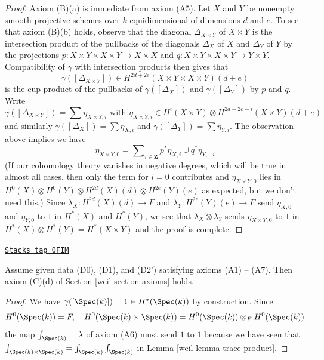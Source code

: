\begin{proof}
Axiom (B)(a) is immediate from axiom (A5).
Let $X$ and $Y$ be nonempty smooth projective schemes over $k$
equidimensional of dimensions $d$ and $e$. To see that axiom (B)(b)
holds, observe that the diagonal $\Delta_{X \times Y}$ of $X \times Y$
is the intersection product of the pullbacks of the diagonals
$\Delta_X$ of $X$ and $\Delta_Y$ of $Y$ by the projections
$p : X \times Y \times X \times Y \to X \times X$ and
$q : X \times Y \times X \times Y \to Y \times Y$.
Compatibility of $\gamma$ with intersection products then gives
that
$$
\gamma([\Delta_{X \times Y}]) \in
H^{2d + 2e}(X \times Y \times X \times Y)(d + e)
$$
is the cup product of the pullbacks of $\gamma([\Delta_X])$
and $\gamma([\Delta_Y])$ by $p$ and $q$. Write
$$
\gamma([\Delta_{X \times Y}]) = \sum \eta_{X \times Y, i}
\text{ with }
\eta_{X \times Y, i} \in
H^i(X \times Y) \otimes H^{2d + 2e - i}(X \times Y)(d + e)
$$
and similarly $\gamma([\Delta_X]) = \sum \eta_{X, i}$ and
$\gamma([\Delta_Y]) = \sum \eta_{Y, i}$. The observation above
implies we have
$$
\eta_{X \times Y, 0} =
\sum\nolimits_{i \in \mathbf{Z}} p^*\eta_{X, i} \cup q^*\eta_{Y, -i}
$$
(If our cohomology theory vanishes in negative degrees, which will
be true in almost all cases, then only the term for $i = 0$ contributes
and $\eta_{X \times Y, 0}$ lies in
$H^0(X) \otimes H^0(Y) \otimes H^{2d}(X)(d) \otimes H^{2e}(Y)(e)$ as expected,
but we don't need this.) Since $\lambda_X : H^{2d}(X)(d) \to F$ and
$\lambda_Y : H^{2e}(Y)(e) \to F$ send $\eta_{X, 0}$ and $\eta_{Y, 0}$
to $1$ in $H^*(X)$ and $H^*(Y)$, we see that $\lambda_X \otimes \lambda_Y$
sends $\eta_{X \times Y, 0}$ to $1$ in
$H^*(X) \otimes H^*(Y) = H^*(X \times Y)$ and the proof is complete.
\end{proof}

\begin{lemma}
\label{weil-lemma-trace-base}
\href{https://stacks.math.columbia.edu/tag/0FIM}{\texttt{Stacks tag 0FIM}}

Assume given data (D0), (D1), and (D2') satisfying axioms (A1) -- (A7).
Then axiom (C)(d) of Section \ref{weil-section-axioms} holds.
\end{lemma}

\begin{proof}

We have $\gamma([\Spec(k)]) = 1 \in H^*(\Spec(k))$ by construction.
Since
$$
H^0(\Spec(k)) = F,\quad
H^0(\Spec(k) \times \Spec(k)) = H^0(\Spec(k)) \otimes_F H^0(\Spec(k))
$$
the map $\int_{\Spec(k)} = \lambda$ of axiom (A6) must send $1$ to $1$
because we have seen that
$\int_{\Spec(k) \times \Spec(k)} = \int_{\Spec(k)} \int_{\Spec(k)}$
in Lemma \ref{weil-lemma-trace-product}.
\end{proof}

